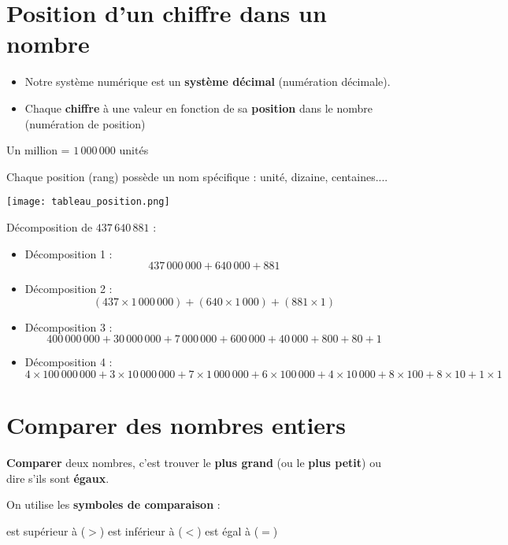 \documentclass[a4paper,dvipsnames]{article}
\begin{document}
\section{Position d'un chiffre dans un nombre}

\begin{Def}
\begin{itemize}
\item Notre système numérique est un \textbf{système décimal} (numération décimale).
\item Chaque \textbf{chiffre} à une valeur en fonction de sa \textbf{position} dans le nombre (numération de position)
\end{itemize}
\end{Def}

\begin{Ex}
Un million = $1\,000\,000$ unités
\end{Ex}

\begin{Voc}
Chaque position (rang) possède un nom spécifique : unité, dizaine, centaines....
    
\begin{center}
    \texttt{[image: tableau\_position.png]}
\end{center}
\end{Voc}

\begin{Mt}
Décomposition de $437\,640\,881$ :
\begin{itemize}
\item Décomposition 1 : 
\[437\,000\,000+640\,000+881\]
\item Décomposition 2 :
\[(437\times1\,000\,000)+(640\times 1\,000)+(881\times1)\]
\item Décomposition 3 :
\[400\,000\,000+30\,000\,000+7\,000\,000+600\,000+40\,000+800+80+1\]
\item Décomposition 4 :
\[4\times100\,000\,000+3\times10\,000\,000+7\times1\,000\,000+6\times100\,000+4\times10\,000+8\times100+8\times10+1\times1\]
\end{itemize}
\end{Mt}

\section{Comparer des nombres entiers}

\begin{Def}
\textbf{Comparer} deux nombres, c'est trouver le \textbf{plus grand} (ou le \textbf{plus petit}) ou dire s'ils sont \textbf{égaux}.

On utilise les \textbf{symboles de comparaison} :
\begin{center}
est supérieur à ($>$) \hspace{1cm} est inférieur à ($<$) \hspace{1cm} est égal à ($=$)
\end{center}
\end{Def}
\end{document}
